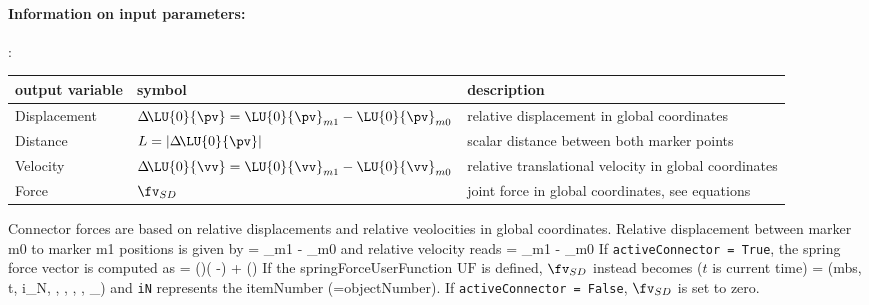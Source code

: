 \paragraph{Information on input parameters:} 
\finishTable

:
\begin{center}
\footnotesize
\begin{longtable}{| p{5cm} | p{5cm} | p{6cm} |} 
\hline
\bf output variable & \bf symbol & \bf description \\ \hline
Displacement & $\Delta\! \LU{0}{\pv} = \LU{0}{\pv}_{m1} - \LU{0}{\pv}_{m0}$ & relative displacement in global coordinates\\ \hline
Distance & $L=|\Delta\! \LU{0}{\pv}|$ & scalar distance between both marker points\\ \hline
Velocity & $\Delta\! \LU{0}{\vv} = \LU{0}{\vv}_{m1} - \LU{0}{\vv}_{m0}$ & relative translational velocity in global coordinates\\ \hline
Force & $\fv_{SD}$ & joint force in global coordinates, see equations\\ \hline
\end{longtable}
\end{center}
 \noindent
    \finishTable
    Connector forces are based on relative displacements and relative veolocities in global coordinates.
    Relative displacement between marker m0 to marker m1 positions is given by
    \be \label{eq_ObjectCartesianSpringDamper_deltaPos}
      \Delta\! = _{m1} - _{m0} \eqComma
    \ee
    and relative velocity reads
    \be
      \Delta\! = _{m1} - _{m0} \eqDot
    \ee
    If \texttt{activeConnector = True}, the spring force vector is computed as
    \be
       = \diag(\kv)\cdot(\Delta\! -) + \diag(\dv) \cdot \Delta\!  \eqDot
    \ee
    If the springForceUserFunction $\mathrm{UF}$ is defined, $\fv_{SD}$ instead becomes ($t$ is current time)
    \be
       = (mbs, t, i_N, \Delta\! , \Delta\! , \kv, \dv, \vv_{}) \eqComma
    \ee
    and \texttt{iN} represents the itemNumber (=objectNumber).
    If \texttt{activeConnector = False}, $\fv_{SD}$ is set to zero.

